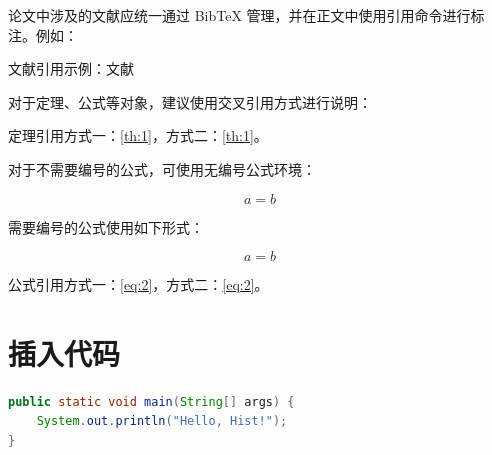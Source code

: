 论文中涉及的文献应统一通过 Bib\TeX{} 管理，并在正文中使用引用命令进行标注。例如：

文献引用示例：文献\cite{example2024paper}

对于定理、公式等对象，建议使用交叉引用方式进行说明：

定理引用方式一：\cref{th:1}，方式二：\ref{th:1}。

对于不需要编号的公式，可使用无编号公式环境：

\begin{equation*}
    a = b
\end{equation*}

需要编号的公式使用如下形式：

\begin{equation}
    \label{eq:2}
    a = b
\end{equation}

公式引用方式一：\ref{eq:2}，方式二：\cref{eq:2}。

\section{插入代码}

\begin{lstlisting}[language=Java, caption={MapReduce 主流程}, label={lst:mr}]
public static void main(String[] args) {
    System.out.println("Hello, Hist!");
}
\end{lstlisting}




